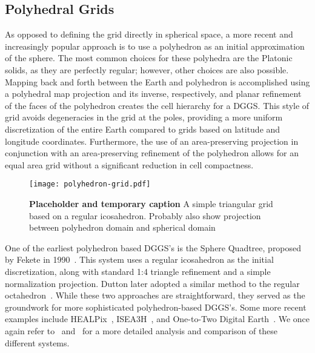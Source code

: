\subsection{Polyhedral Grids} \label{chap:2:polyhedral}
As opposed to defining the grid directly in spherical space, a more recent and increasingly popular approach is to use a polyhedron as an initial approximation of the sphere.
The most common choices for these polyhedra are the Platonic solids, as they are perfectly regular; however, other choices are also possible.
Mapping back and forth between the Earth and polyhedron is accomplished using a polyhedral map projection and its inverse, respectively, and planar refinement of the faces of the polyhedron creates the cell hierarchy for a DGGS.
This style of grid avoids degeneracies in the grid at the poles, providing a more uniform discretization of the entire Earth compared to grids based on latitude and longitude coordinates.
Furthermore, the use of an area-preserving projection in conjunction with an area-preserving refinement of the polyhedron allows for an equal area grid without a significant reduction in cell compactness.


\begin{figure}[h]
	\centering
	\texttt{[image: polyhedron-grid.pdf]}
	\caption[A Icosahedron Based Grid]{
		\textbf{Placeholder and temporary caption} A simple triangular grid based on a regular icosahedron.
		Probably also show projection between polyhedron domain and spherical domain
	}
	\label{fig:poly-grid}
\end{figure}


One of the earliest polyhedron based DGGS's is the Sphere Quadtree, proposed by Fekete in 1990~\cite{fekete1990sphere}.
This system uses a regular icosahedron as the initial discretization, along with standard 1:4 triangle refinement and a simple normalization projection.
Dutton later adopted a similar method to the regular octahedron~\cite{dutton1996encoding}.
While these two approaches are straightforward, they served as the groundwork for more sophisticated polyhedron-based DGGS's.
Some more recent examples include HEALPix~\cite{gorski2005healpix}, ISEA3H~\cite{sahr2003geodesic}, and One-to-Two Digital Earth~\cite{mahdavi2013one}.
We once again refer to~\cite{mahdavi2015survey} and~\cite{alderson2020digital} for a more detailed analysis and comparison of these different systems.


